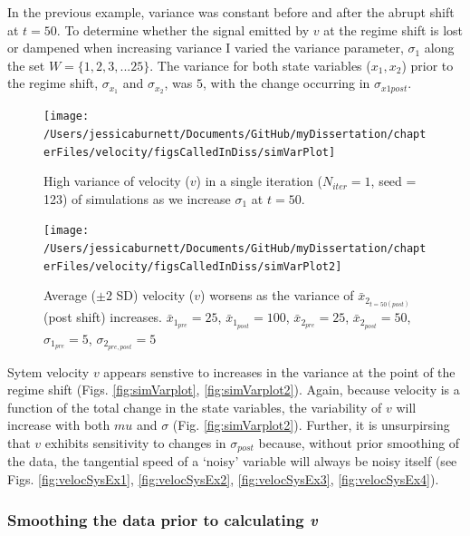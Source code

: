 \documentclass[12pt,twoside,openany]{reedthesis}
\begin{document}
In the previous example, variance was constant before and after the abrupt shift at \(t=50\). To determine whether the signal emitted by \(v\) at the regime shift is lost or dampened when increasing variance I varied the variance parameter, \(\sigma_1\) along the set \(W = \{1,2,3,...25 \}\). The variance for both state variables (\(x_1, x_2\)) prior to the regime shift, \(\sigma_{x_1}\) and \(\sigma_{x_2}\), was \(5\), with the change occurring in \(\sigma_{x1post}\).
\begin{figure}
\texttt{[image: /Users/jessicaburnett/Documents/GitHub/myDissertation/chapterFiles/velocity/figsCalledInDiss/simVarPlot]} \caption{High variance of velocity ($v$) in a single iteration ($N_{iter}=1$, seed = 123) of simulations as we increase $\sigma_1$ at $t=50$.}\label{fig:simVarPlot}
\end{figure}
\begin{figure}
\texttt{[image: /Users/jessicaburnett/Documents/GitHub/myDissertation/chapterFiles/velocity/figsCalledInDiss/simVarPlot2]} \caption{Average ($\pm 2$ SD) velocity ($v$) worsens as the variance of $\bar{x}_{2_{t=50 (post)}}$ (post shift) increases. $\bar{x}_{1_{pre}} = 25$, $\bar{x}_{1_{post}} = 100$, $\bar{x}_{2_{pre}} = 25$, $\bar{x}_{2_{post}} = 50$, $\sigma_{1_{pre}} = 5$, $\sigma_{2_{pre,post}} = 5$}\label{fig:simVarPlot2}
\end{figure}
Sytem velocity \(v\) appears senstive to increases in the variance at the point of the regime shift (Figs. \ref{fig:simVarplot}, \ref{fig:simVarplot2}). Again, because velocity is a function of the total change in the state variables, the variability of \(v\) will increase with both \(mu\) and \(\sigma\) (Fig. \ref{fig:simVarplot2}). Further, it is unsurpirsing that \(v\) exhibits sensitivity to changes in \(\sigma_{post}\) because, without prior smoothing of the data, the tangential speed of a `noisy' variable will always be noisy itself (see Figs. \ref{fig:velocSysEx1}, \ref{fig:velocSysEx2}, \ref{fig:velocSysEx3}, \ref{fig:velocSysEx4}).

\hypertarget{smoothing-the-data-prior-to-calculating-v}{%
\subsubsection{\texorpdfstring{Smoothing the data prior to calculating \emph{v}}{Smoothing the data prior to calculating v}}\label{smoothing-the-data-prior-to-calculating-v}}
\end{document}
